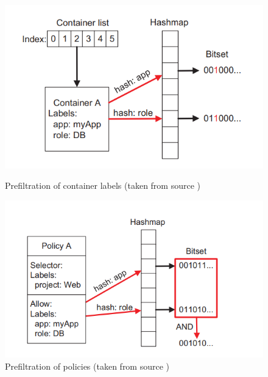 \begin{figure}[htbp]
  \centering
  \begin{minipage}[b]{0.45\linewidth}
    \centering
    \includegraphics[width=\textwidth]{images/prefil_cont_labels.png}
    \caption{Prefiltration of container labels (taken from source \cite{kano})}
    \label{fig:kano-cont-prefiltration}
  \end{minipage}
  \quad %
  \begin{minipage}[b]{0.45\linewidth}
    \centering
    \includegraphics[width=\textwidth]{images/prefil_pols.png}
    \caption{Prefiltration of policies (taken from source \cite{kano})}
    \label{fig:kano-pol-prefiltration}
  \end{minipage}
\end{figure}

